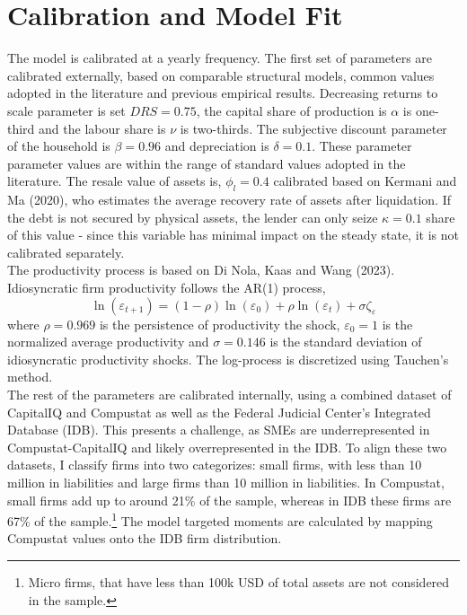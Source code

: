 \documentclass[12pt]{article}
\begin{document}
\section{Calibration and Model Fit}
The model is calibrated at a yearly frequency. The first set of parameters are calibrated externally, based on comparable structural models, common values adopted in the literature and previous empirical results. Decreasing returns to scale parameter is set $DRS = 0.75$, the capital share of production is $\alpha$ is one-third and the labour share is $\nu$ is two-thirds. The subjective discount parameter of the household is $\beta = 0.96$ and depreciation is $\delta = 0.1$. These parameter parameter values are within the range of standard values adopted in the literature. The resale value of assets is, $\phi_l = 0.4$ calibrated based on Kermani and Ma (2020), who estimates the average recovery rate of assets after liquidation. If the debt is not secured by physical assets, the lender can only seize $\kappa = 0.1$ share of this value - since this variable has minimal impact on the steady state, it is not calibrated separately. \vspace{3mm} \\
The productivity process is based on Di Nola, Kaas and Wang (2023).  Idiosyncratic firm productivity follows the AR(1) process,
$$ \ln(\varepsilon_{t+1}) = (1-\rho) \ln(\varepsilon_0) + \rho \ln(\varepsilon_t) + \sigma \zeta_\varepsilon $$ where $\rho = 0.969$ is the persistence of productivity the shock, $\varepsilon_0 = 1$ is the normalized average productivity and $\sigma = 0.146$ is the standard deviation of idiosyncratic productivity shocks. The log-process is discretized using Tauchen's method.  \vspace{3mm} \\
The rest of the parameters are calibrated internally, using a combined dataset of CapitalIQ and Compustat as well as the Federal Judicial Center's Integrated Database (IDB). This presents a challenge, as SMEs are underrepresented in Compustat-CapitalIQ and likely overrepresented in the IDB. To align these two datasets, I classify firms into two categorizes: small firms, with less than 10 million in liabilities and large firms than 10 million in liabilities. In Compustat, small firms add up to around 21\% of the sample, whereas in IDB these firms are 67\% of the sample.\footnote{Micro firms, that have less than 100k USD of total assets are not considered in the sample.} The model targeted moments are calculated by mapping Compustat values onto the IDB firm distribution. \vspace{3mm} \\
\end{document}
